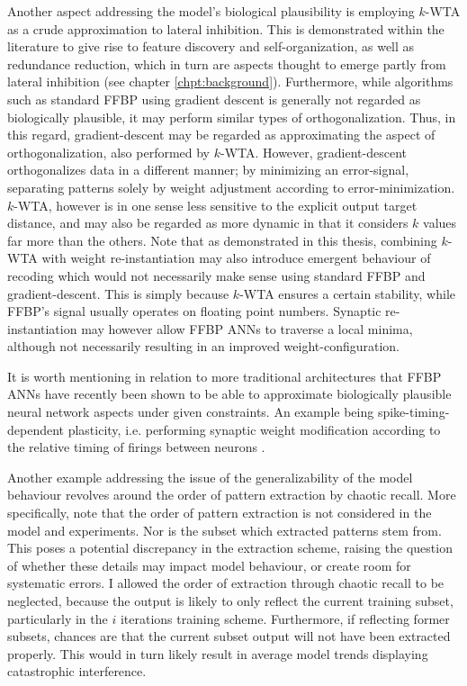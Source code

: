 Another aspect addressing the model's biological plausibility is employing $k$-WTA as a crude approximation to lateral inhibition. This is demonstrated within the literature to give rise to feature discovery and self-organization, as well as redundance reduction, which in turn are aspects thought to emerge partly from lateral inhibition (see chapter \ref{chpt:background}).
Furthermore, while algorithms such as standard FFBP using gradient descent is generally not regarded as biologically plausible, it may perform similar types of orthogonalization. Thus, in this regard, gradient-descent may be regarded as approximating the aspect of orthogonalization, also performed by $k$-WTA. However, gradient-descent orthogonalizes data in a different manner; by minimizing an error-signal, separating patterns solely by weight adjustment according to error-minimization. $k$-WTA, however is in one sense less sensitive to the explicit output target distance, and may also be regarded as more dynamic in that it considers $k$ values far more than the others. Note that as demonstrated in this thesis, combining $k$-WTA with weight re-instantiation may also introduce emergent behaviour of recoding which would not necessarily make sense using standard FFBP and gradient-descent. This is simply because $k$-WTA ensures a certain stability, while FFBP's signal usually operates on floating point numbers. Synaptic re-instantiation may however allow FFBP ANNs to traverse a local minima, although not necessarily resulting in an improved weight-configuration.

It is worth mentioning in relation to more traditional architectures that FFBP ANNs have recently been shown to be able to approximate biologically plausible neural network aspects under given constraints. An example being spike-timing-dependent plasticity, i.e. performing synaptic weight modification according to the relative timing of firings between neurons \citep{Bengio2015}.

Another example addressing the issue of the generalizability of the model behaviour revolves around the order of pattern extraction by chaotic recall. More specifically, note that the order of pattern extraction is not considered in the model and experiments. Nor is the subset which extracted patterns stem from. This poses a potential discrepancy in the extraction scheme, raising the question of whether these details may impact model behaviour, or create room for systematic errors. 
I allowed the order of extraction through chaotic recall to be neglected, because the output is likely to only reflect the current training subset, particularly in the $i$ iterations training scheme. Furthermore, if reflecting former subsets, chances are that the current subset output will not have been extracted properly. This would in turn likely result in average model trends displaying catastrophic interference.

